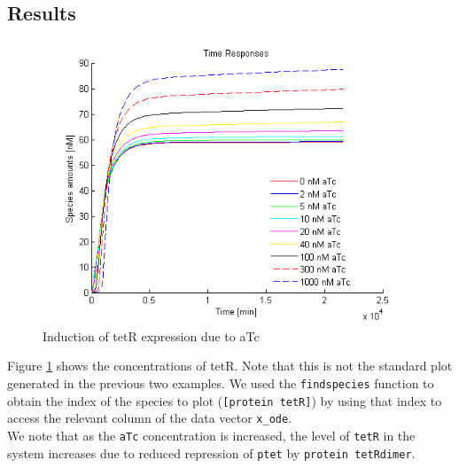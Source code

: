 \documentclass[english]{report}
\begin{document}
		
		
		\subsection{Results}	
		\begin{figure}
		\begin{center}
		\includegraphics[width=\textwidth]{induction.png} 
		\caption{Induction of tetR expression due to aTc}
		\label{fig:induction}
		\end{center}
		
		\end{figure}
		Figure \ref{fig:induction} shows the concentrations of tetR. Note that this is not the standard plot generated in the previous two examples. We used the \texttt{findspecies} function to obtain the index of the species to plot (\texttt{[protein tetR]}) by using that index to access the relevant column of the data vector \texttt{x\_ode}. \\
		
		We note that as the \texttt{aTc} concentration is increased, the level of \texttt{tetR} in the system increases due to reduced repression of \texttt{ptet} by \texttt{protein tetRdimer}. 
		
\end{document}
